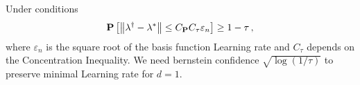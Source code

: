 \begin{theorem}
  Under conditions
  \begin{gather}
    \mathbf{P}
    \left[ 
      \left\lVert\lambda^\dagger - \lambda^*\right\rVert
      \le
      C_{\mathbf{P}}
      C_\tau
      \varepsilon_n
    \right]
    \ge
    1-\tau
    \,,
  \end{gather}
  where 
  $\varepsilon_n$ is the square root of the basis function Learning rate and $C_\tau$ depends on the Concentration Inequality.
  We need bernstein confidence $\sqrt{\log (1/\tau)}$ to preserve minimal Learning rate for $d=1$.
\end{theorem}
